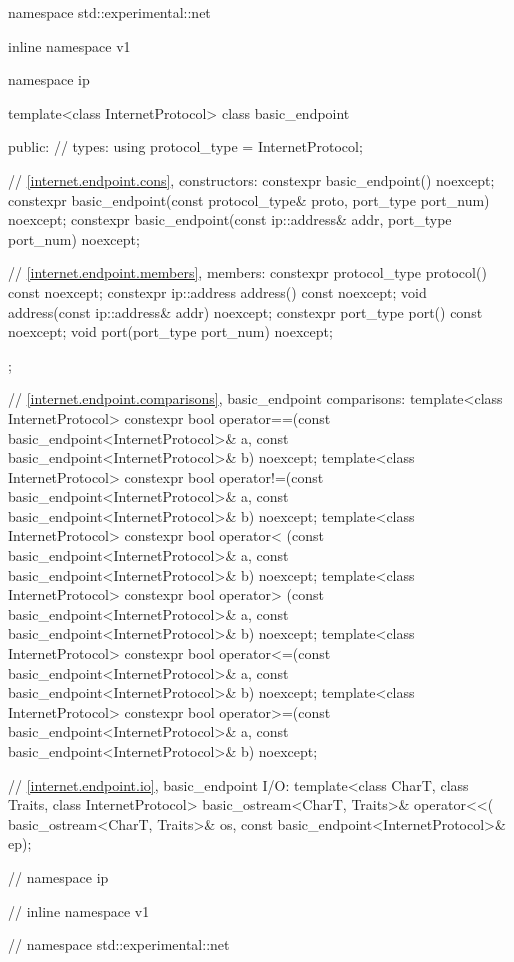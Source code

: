 \begin{codeblock}
namespace std::experimental::net {
inline namespace v1 {
namespace ip {

  template<class InternetProtocol>
  class basic_endpoint
  {
  public:
    // types:
    using protocol_type = InternetProtocol;

    // \ref{internet.endpoint.cons}, constructors:
    constexpr basic_endpoint() noexcept;
    constexpr basic_endpoint(const protocol_type& proto,
                             port_type port_num) noexcept;
    constexpr basic_endpoint(const ip::address& addr,
                             port_type port_num) noexcept;

    // \ref{internet.endpoint.members}, members:
    constexpr protocol_type protocol() const noexcept;
    constexpr ip::address address() const noexcept;
    void address(const ip::address& addr) noexcept;
    constexpr port_type port() const noexcept;
    void port(port_type port_num) noexcept;
  };

  // \ref{internet.endpoint.comparisons}, basic_endpoint comparisons:
  template<class InternetProtocol>
    constexpr bool operator==(const basic_endpoint<InternetProtocol>& a,
                              const basic_endpoint<InternetProtocol>& b) noexcept;
  template<class InternetProtocol>
    constexpr bool operator!=(const basic_endpoint<InternetProtocol>& a,
                              const basic_endpoint<InternetProtocol>& b) noexcept;
  template<class InternetProtocol>
    constexpr bool operator< (const basic_endpoint<InternetProtocol>& a,
                              const basic_endpoint<InternetProtocol>& b) noexcept;
  template<class InternetProtocol>
    constexpr bool operator> (const basic_endpoint<InternetProtocol>& a,
                              const basic_endpoint<InternetProtocol>& b) noexcept;
  template<class InternetProtocol>
    constexpr bool operator<=(const basic_endpoint<InternetProtocol>& a,
                              const basic_endpoint<InternetProtocol>& b) noexcept;
  template<class InternetProtocol>
    constexpr bool operator>=(const basic_endpoint<InternetProtocol>& a,
                              const basic_endpoint<InternetProtocol>& b) noexcept;

  // \ref{internet.endpoint.io}, basic_endpoint I/O:
  template<class CharT, class Traits, class InternetProtocol>
    basic_ostream<CharT, Traits>& operator<<(
      basic_ostream<CharT, Traits>& os,
      const basic_endpoint<InternetProtocol>& ep);

} // namespace ip
} // inline namespace v1
} // namespace std::experimental::net
\end{codeblock}

